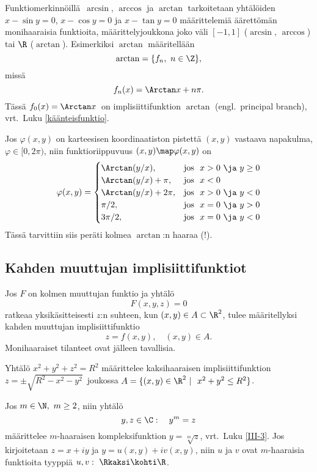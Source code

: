 Funktiomerkinnöillä $\,\arcsin$, $\arccos$ ja $\arctan$ tarkoitetaan yhtälöiden $x-\sin y =0$,
$x-\cos y=0$ ja $x-\tan y=0$ määrittelemiä äärettömän monihaaraisia funktioita,
määrittelyjoukkona joko väli $[-1,1]$ ($\arcsin,\,\arccos$) tai $\R$ ($\arctan$). Esimerkiksi
$\arctan$ määritellään
\[
\arctan = \{f_n, \ n\in\Z\},
\]
missä
\[
f_n(x)= \Arctan x + n\pi.
\]
Tässä $f_0(x)=\Arctan x\,$ on implisiittifunktion $\arctan$  
(engl.\ principal branch), vrt.\ Luku \ref{käänteisfunktio}.
\begin{Exa} \label{napakulman kaava} Jos $\varphi(x,y)$ on karteesisen koordinaatiston
pistettä $(x,y)$ vastaava napakulma, $\varphi\in[0,2\pi)$, niin funktioriippuvuus 
$(x,y)\map\varphi(x,y)$ on
\[
\varphi(x,y)=
\begin{cases}
\Arctan(y/x),      &\text{jos}\ \ x>0\ \ja\ y\geq 0 \\
\Arctan(y/x)+\pi,  &\text{jos}\ \ x<0 \\
\Arctan(y/x)+2\pi, &\text{jos}\ \ x>0\ \ja\ y<0 \\
\pi/2,             &\text{jos}\ \ x=0\ \ja\ y>0 \\
3\pi/2,            &\text{jos}\ \ x=0\ \ja\ y<0
\end{cases}
\]
Tässä tarvittiin siis peräti kolmea $\arctan$:n haaraa (!).
\loppu
\begin{figure}[H]
\begin{center}

\end{center}
\end{figure}
\end{Exa}

\subsection*{Kahden muuttujan implisiittifunktiot}

Jos $F$ on kolmen muuttujan funktio ja yhtälö
\[
F(x,y,z)=0
\]
ratkeaa yksikäsitteisesti $z$:n suhteen, kun $(x,y)\in A\subset\R^2$, tulee määritellyksi
kahden muuttujan implisiittifunktio
\[
z=f(x,y), \quad (x,y)\in A.
\]
Monihaaraiset tilanteet ovat jälleen tavallisia.
\begin{Exa}
Yhtälö $x^2+y^2+z^2=R^2$ määrittelee kaksihaaraisen implisiittifunktion
$z=\pm\sqrt{R^2-x^2-y^2}\,$ joukossa $A=\{(x,y)\in\R^2 \ | \ x^2+y^2\leq R^2\}$. \loppu
\end{Exa}
\begin{Exa} Jos $m\in\N,\ m \ge 2$, niin yhtälö
\[
y,z\in\C: \quad y^m=z
\]
määrittelee $m$-haaraisen kompleksifunktion $y=\sqrt[m]{z}$, vrt.\ Luku \ref{III-3}.
Jos kirjoitetaan $z=x+iy$ ja $y=u(x,y)+iv(x,y)$, niin $u$ ja $v$ ovat $m$-haaraisia
funktioita tyyppiä $u,v:\ \Rkaksi\kohti\R$. \loppu
\end{Exa}

